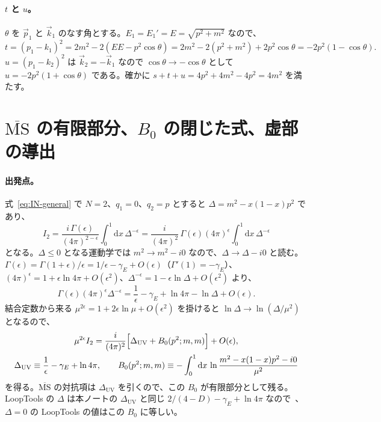\documentclass[a4paper,10pt]{ltjsarticle}
\newcommand{\dd}{\mathrm{d}}
\begin{document}
\paragraph{$t$ と $u$。}$\theta$ を $\vec p_1$ と $\vec k_1$ のなす角とする。$E_1=E_1'=E=\sqrt{p^2+m^2}$ なので、
\begin{equation*}
t=(p_1-k_1)^2=2m^2-2(EE-p^2\cos\theta)=2m^2-2(p^2+m^2)+2p^2\cos\theta=-2p^2(1-\cos\theta).
\end{equation*}
$u=(p_1-k_2)^2$ は $\vec k_2=-\vec k_1$ なので $\cos\theta\to-\cos\theta$ として $u=-2p^2(1+\cos\theta)$ である。確かに $s+t+u=4p^2+4m^2-4p^2=4m^2$ を満たす。

\section{$\overline{\mathrm{MS}}$ の有限部分、$B_0$ の閉じた式、虚部の導出}\label{app:b0}

\paragraph{出発点。}式~\eqref{eq:IN-general} で $N=2$、$q_1=0$、$q_2=p$ とすると $\Delta=m^2-x(1-x)p^2$ であり、
\begin{equation*}
I_2=\frac{i\,\Gamma(\epsilon)}{(4\pi)^{2-\epsilon}}\int_0^1\dd x\,\Delta^{-\epsilon}=\frac{i}{(4\pi)^2}\,\Gamma(\epsilon)(4\pi)^{\epsilon}\int_0^1\dd x\,\Delta^{-\epsilon}
\end{equation*}
となる。$\Delta\le0$ となる運動学では $m^2\to m^2-i0$ なので、$\Delta\to\Delta-i0$ と読む。$\Gamma(\epsilon)=\Gamma(1+\epsilon)/\epsilon=1/\epsilon-\gamma_E+O(\epsilon)$（$\Gamma'(1)=-\gamma_E$）、$(4\pi)^\epsilon=1+\epsilon\ln4\pi+O(\epsilon^2)$、$\Delta^{-\epsilon}=1-\epsilon\ln\Delta+O(\epsilon^2)$ より、
\begin{equation*}
\Gamma(\epsilon)(4\pi)^\epsilon\Delta^{-\epsilon}=\frac1\epsilon-\gamma_E+\ln4\pi-\ln\Delta+O(\epsilon).
\end{equation*}
結合定数から来る $\mu^{2\epsilon}=1+2\epsilon\ln\mu+O(\epsilon^2)$ を掛けると $\ln\Delta\to\ln(\Delta/\mu^2)$ となるので、
\begin{gather*}
\mu^{2\epsilon}I_2=\frac{i}{(4\pi)^2}\Bigl[\Delta_{\mathrm{UV}}+B_0(p^2;m,m)\Bigr]+O(\epsilon),\\
\Delta_{\mathrm{UV}}\equiv\frac1\epsilon-\gamma_E+\ln4\pi,\qquad
B_0(p^2;m,m)\equiv-\int_0^1\dd x\,\ln\frac{m^2-x(1-x)p^2-i0}{\mu^2}
\end{gather*}
を得る。$\overline{\mathrm{MS}}$ の対抗項は $\Delta_{\mathrm{UV}}$ を引くので、この $B_0$ が有限部分として残る。LoopTools の $\Delta$ は本ノートの $\Delta_{\mathrm{UV}}$ と同じ $2/(4-D)-\gamma_E+\ln4\pi$ なので~\cite{env}、$\Delta=0$ の LoopTools の値はこの $B_0$ に等しい。
\end{document}
